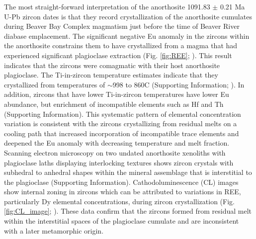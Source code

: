 \documentclass[draft]{agujournal2019}
\begin{document}
The most straight-forward interpretation of the anorthosite 1091.83 $\pm$ 0.21 Ma U-Pb zircon dates is that they record crystallization of the anorthosite cumulates during Beaver Bay Complex magmatism just before the time of Beaver River diabase emplacement. The significant negative Eu anomaly in the zircons within the anorthosite constrains them to have crystallized from a magma that had experienced significant plagioclase extraction (Fig. \ref{fig:REE}; ). This result indicates that the zircons were comagmatic with their host anorthosite plagioclase. The Ti-in-zircon temperature estimates indicate that they crystallized from temperatures of $\sim$998 to 860\textdegree C (Supporting Information; ). In addition, zircons that have lower Ti-in-zircon temperatures have lower Eu abundance, but enrichment of incompatible elements such as Hf and Th (Supporting Information). This systematic pattern of elemental concentration variation is consistent with the zircons crystallizing from residual melts on a cooling path that increased incorporation of incompatible trace elements and deepened the Eu anomaly with decreasing temperature and melt fraction. Scanning electron microscopy on two undated anorthosite xenoliths with plagioclase laths displaying interlocking textures shows zircon crystals with subhedral to anhedral shapes within the mineral assemblage that is interstitial to the plagioclase (Supporting Information). Cathodoluminescence (CL) images show internal zoning in zircons which can be attributed to variations in REE, particularly Dy elemental concentrations, during zircon crystallization (Fig. \ref{fig:CL_image}; ). These data confirm that the zircons formed from residual melt within the interstitial spaces of the plagioclase cumulate and are inconsistent with a later metamorphic origin.
\end{document}
